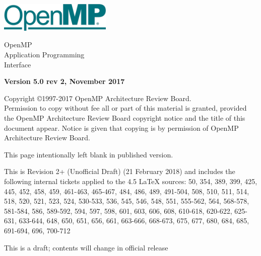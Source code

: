 
  \begin{titlepage}
    \begin{flushleft}
     \hspace{-6em} \includegraphics[width=0.4\textwidth]{openmp-logo.png}
    \end{flushleft}

    \begin{adjustwidth}{-0.75in}{0in}
    \begin{center}
      \Huge
      \textsf{OpenMP\\Application Programming\\Interface}

      \vspace{0.5in}\textsf{    }\vspace{-0.7in}
      \normalsize

      \vspace{1.0in}

      \textbf{Version 5.0 rev 2, November 2017}
    \end{center}
    \end{adjustwidth}

    \vspace{3.0in}

\begin{adjustwidth}{0pt}{1em}\setlength{\parskip}{0.25\baselineskip}%
Copyright \copyright 1997-2017 OpenMP Architecture Review Board.\\
Permission to copy without fee all or part of this material is granted,
provided the OpenMP Architecture Review Board copyright notice and
the title of this document appear. Notice is given that copying is by
permission of OpenMP Architecture Review Board.\end{adjustwidth}

  \end{titlepage}


\clearpage
\thispagestyle{empty}
\phantom{a}
This page intentionally left blank in published version.

This is Revision 2+ (Unofficial Draft) (21 February 2018) and
includes the following internal tickets applied to the 4.5 LaTeX sources:
50, 354, 389, 399, 425, 445, 452, 458, 459, 461-463, 465-467, 484, 486, 489, 
491-504, 508, 510, 511, 514, 518, 520, 521, 523, 524, 530-533, 536, 545, 
546, 548, 551, 555-562, 564, 568-578, 581-584, 586, 589-592, 594, 597, 598,
601, 603, 606, 608, 610-618, 620-622, 625-631, 633-644, 648, 650, 651, 656, 
661, 663-666, 668-673, 675, 677, 680, 684, 685, 691-694, 696, 700-712

This is a draft; contents will change in official release

\vfill

